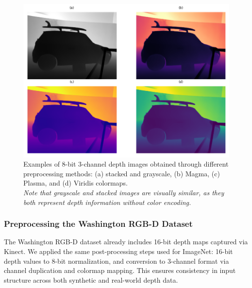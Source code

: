 \begin{figure}[h]
    \centering
    \includegraphics[width=1\linewidth]{./images/stacked-plasma-virdis-and-magma.png}
    \caption{Examples of 8-bit 3-channel depth images obtained through different preprocessing methods: (a) stacked and grayscale, (b) Magma, (c) Plasma, and (d) Viridis colormaps. \\ \textit{Note that grayscale and stacked images are visually similar, as they both represent depth information without color encoding.}}
    \label{fig:depth-color-mapping-examples}
\end{figure}

\subsubsection{Preprocessing the Washington RGB-D Dataset}
The Washington RGB-D dataset already includes 16-bit depth maps captured via Kinect. We applied the same post-processing steps used for ImageNet: 16-bit depth values to 8-bit normalization, and conversion to 3-channel format via channel duplication and colormap mapping. This ensures consistency in input structure across both synthetic and real-world depth data.
